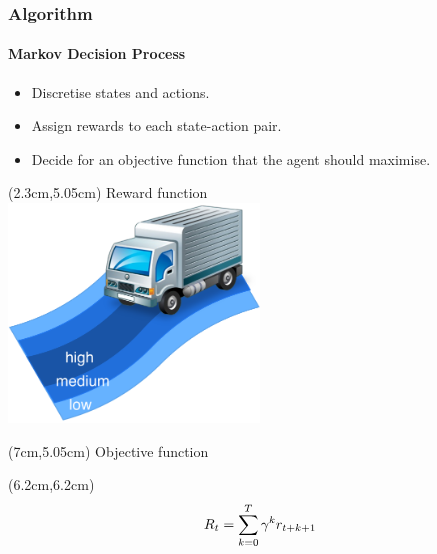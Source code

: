 \documentclass[t]{beamer}
\begin{document}
\begin{frame}
\frametitle{Algorithm}
\framesubtitle{Markov Decision Process}
\begin{itemize}
\item Discretise states and actions.
\item Assign rewards to each state-action pair.
\item Decide for an objective function that the agent should maximise.
\end{itemize}
\begin{textblock*}{7cm}(2.3cm,5.05cm) %
\small{Reward function}\\
\includegraphics[trim=0mm 0mm 0mm 0mm, width=0.5\textwidth]{Reward}
\end{textblock*}
\begin{textblock*}{5cm}(7cm,5.05cm) %
\small{Objective function}
\end{textblock*}
\begin{textblock*}{5cm}(6.2cm,6.2cm) 
\begin{equation*}
\noindent
R_t = \sum_{k=0}^T\gamma^kr_{t+k+1}
\end{equation*}
\end{textblock*}
\end{frame}
\end{document}
